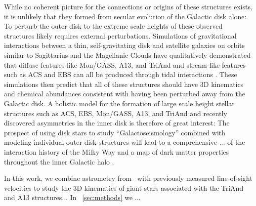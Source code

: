 \documentclass[modern]{aastex62}
\newcommand{\gaia}{\project{Gaia}}
\begin{document}
While no coherent picture for the connections or origins of these structures
exists, it is unlikely that they formed from secular evolution of the Galactic
disk alone:
To perturb the outer disk to the extreme scale heights of these observed
structures likely requires external perturbations.
Simulations of gravitational interactions between a thin, self-gravitating disk
and satellite galaxies on orbits similar to Sagittarius and the Magellanic
Clouds have qualitatively demonstrated that diffuse features like Mon/GASS, A13,
and TriAnd and stream-like features such as ACS and EBS can all be produced
through tidal interactions \citep{Purcell:2011, Price-Whelan:2015, Gomez:2016,
Laporte:2018, Laporte:2018a}.
These simulations then predict that all of these structures should have 3D
kinematics and chemical abundances consistent with having been perturbed away
from the Galactic disk.
A holistic model for the formation of large scale height stellar structures such
as ACS, EBS, Mon/GASS, A13, and TriAnd and recently discovered asymmetries in
the inner disk \citep[e.g.,][]{Widrow:2012, Antoja:2018} is therefore of great
interest:
The prospect of using disk stars to study ``Galactoseismology'' combined with
modeling individual outer disk structures will lead to a comprehensive ... of
the interaction history of the Milky Way and a map of dark matter properties
throughout the inner Galactic halo \citep[e.g.,][]{Widrow:2012, Laporte:2018b}.

In this work, we combine astrometry from \gaia\ with previously measured
line-of-sight velocities to study the 3D kinematics of giant stars associated
with the TriAnd and A13 structures...
In \sectionname~\ref{sec:methods} we ...

\end{document}
